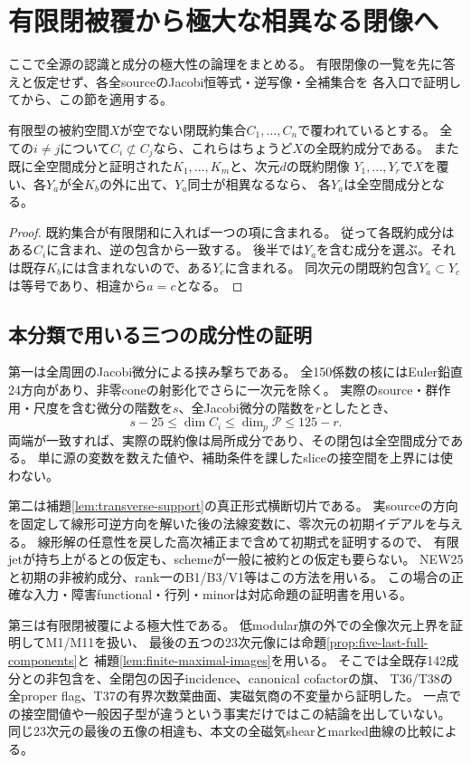 \section{有限閉被覆から極大な相異なる閉像へ}\label{sec:maximal-image-synthesis}
ここで全源の認識と成分の極大性の論理をまとめる。
有限閉像の一覧を先に答えと仮定せず、各全sourceのJacobi恒等式・逆写像・全補集合を
各入口で証明してから、この節を適用する。

\begin{lemma}[有限閉被覆の極大像]
\label{lem:finite-maximal-images}
有限型の被約空間$X$が空でない閉既約集合$C_1,\ldots,C_n$で覆われているとする。
全ての$i\ne j$について$C_i\not\subset C_j$なら、これらはちょうど$X$の全既約成分である。
また既に全空間成分と証明された$K_1,\ldots,K_m$と、次元$d$の既約閉像
$Y_1,\ldots,Y_r$で$X$を覆い、各$Y_a$が全$K_b$の外に出て、$Y_a$同士が相異なるなら、
各$Y_a$は全空間成分となる。
\end{lemma}
\begin{proof}
既約集合が有限閉和に入れば一つの項に含まれる。
従って各既約成分はある$C_i$に含まれ、逆の包含から一致する。
後半では$Y_a$を含む成分を選ぶ。それは既存$K_b$には含まれないので、ある$Y_c$に含まれる。
同次元の閉既約包含$Y_a\subset Y_c$は等号であり、相違から$a=c$となる。
\end{proof}

\subsection{本分類で用いる三つの成分性の証明}
第一は全周囲のJacobi微分による挟み撃ちである。
全150係数の核にはEuler鉛直24方向があり、非零coneの射影化でさらに一次元を除く。
実際のsource・群作用・尺度を含む微分の階数を$s$、全Jacobi微分の階数を$r$としたとき、
\[
 s-25\le\dim C_i\le\dim_p\mathcal P\le125-r.
\]
両端が一致すれば、実際の既約像は局所成分であり、その閉包は全空間成分である。
単に源の変数を数えた値や、補助条件を課したsliceの接空間を上界には使わない。

第二は補題\ref{lem:transverse-support}の真正形式横断切片である。
実sourceの方向を固定して線形可逆方向を解いた後の法線変数に、零次元の初期イデアルを与える。
線形解の任意性を戻した高次補正まで含めて初期式を証明するので、
有限jetが持ち上がるとの仮定も、schemeが一般に被約との仮定も要らない。
NEW25と初期の非被約成分、rank一のB1/B3/V1等はこの方法を用いる。
この場合の正確な入力・障害functional・行列・minorは対応命題の証明書を用いる。

第三は有限閉被覆による極大性である。
低modular旗の外での全像次元上界を証明してM1/M11を扱い、
最後の五つの23次元像には命題\ref{prop:five-last-full-components}と
補題\ref{lem:finite-maximal-images}を用いる。
そこでは全既存142成分との非包含を、全閉包の因子incidence、canonical cofactorの旗、
T36/T38の全proper flag、T37の有界次数葉曲面、実磁気商の不変量から証明した。
一点での接空間値や一般因子型が違うという事実だけではこの結論を出していない。
同じ23次元の最後の五像の相違も、本文の全磁気shearとmarked曲線の比較による。

